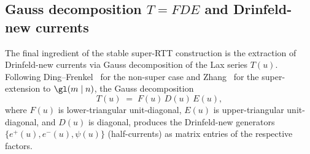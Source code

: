 \subsection{Gauss decomposition $T = FDE$ and Drinfeld-new currents}
\label{subsec:gauss-decomposition-drinfeld-new}

The final ingredient of the stable super-RTT construction is the
extraction of Drinfeld-new currents via Gauss decomposition of the
Lax series $T(u)$. Following Ding--Frenkel~\cite{DingFrenkel1993} for
the non-super case and Zhang~\cite{Zhang1995} for the super-extension
to $\gl(m \mid n)$, the Gauss decomposition
\begin{equation}\label{eq:gauss-FDE}
 T(u) \;=\; F(u)\, D(u)\, E(u),
\end{equation}
where $F(u)$ is lower-triangular unit-diagonal, $E(u)$ is
upper-triangular unit-diagonal, and $D(u)$ is diagonal, produces the
Drinfeld-new generators
$\{e^+(u), e^-(u), \psi(u)\}$ (half-currents) as matrix entries of
the respective factors.

